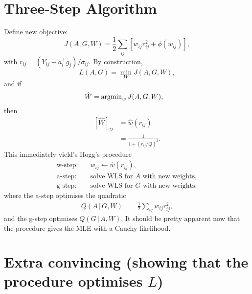 \documentclass[11pt]{article}
\begin{document}
\section*{Three-Step Algorithm}

Define new objective:
\begin{equation}
    J(A,G,W) = \frac{1}{2}\sum_{ij} \left[ w_{ij} r_{ij}^2 + \phi(w_{ij}) \right],
\end{equation}
with $r_{ij} = (Y_{ij} - a_i^\top g_j)/\sigma_{ij}$.
By construction,
\begin{equation}
    L(A,G) = \min_W J(A,G,W),
\end{equation}
and if
\begin{align}
    \hat{W} &= {\rm argmin}_w \, J(A, G, W),
\end{align}
then
\begin{align}
    \left[ \hat{W} \right]_{ij} &= \hat{w} (r_{ij}) \\
    &= \frac{1}{1 + (r_{ij} / Q)^2}.
\end{align}
This immediately yield's Hogg's procedure
\begin{align*}
    \text{w-step:} \quad & w_{ij} \leftarrow \hat{w}(r_{ij}), \\
    \text{a-step:} \quad & \text{solve WLS for $A$ with new weights}, \\
    \text{g-step:} \quad & \text{solve WLS for $G$ with new weights}.
\end{align*}
where the a-step optimises the quadratic
\begin{align}
    Q(A \, | \, G, W) &= \frac{1}{2} \sum_{ij} w_{ij} r_{ij}^2,
\end{align}
and the g-step optimises $Q(G \, | \, A, W)$.
It should be pretty apparent now that the procedure gives the MLE with a Cauchy likelihood.

\section*{Extra convincing (showing that the procedure optimises $L$)}
\end{document}
